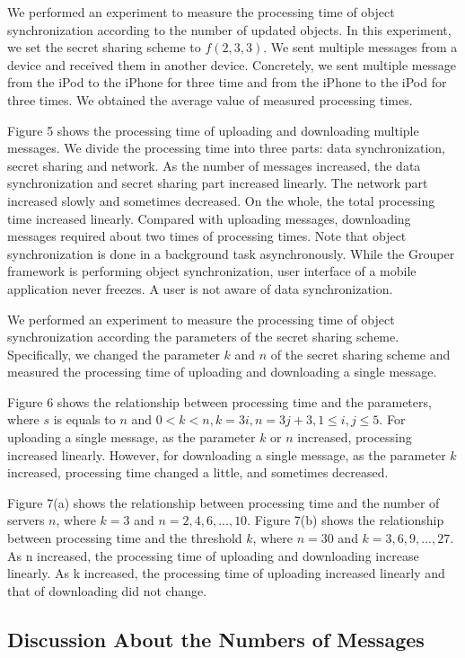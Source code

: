 \documentclass[twocolumn,10pt]{article}
\begin{document}
We performed an experiment to measure the processing time of object synchronization according to the number of updated objects.
In this experiment, we set the secret sharing scheme to ${f(2, 3, 3)}$.
We sent multiple messages from a device and received them in another device. 
Concretely, we sent multiple message from the iPod to the iPhone for three time and from the iPhone to the iPod for three times.
We obtained the average value of measured processing times.

Figure 5 shows the processing time of uploading and downloading multiple messages.
We divide the processing time into three parts: data synchronization, secret sharing and network.
As the number of messages increased, the data synchronization and secret sharing part increased linearly. 
The network part increased slowly and sometimes decreased.
On the whole, the total processing time increased linearly.
Compared with uploading messages, downloading messages required about two times of processing times.
Note that object synchronization is done in a background task asynchronously.
While the Grouper framework is performing object synchronization, user interface of a mobile application never freezes.
A user is not aware of data synchronization.

We performed an experiment to measure the processing time of object synchronization according the parameters of the secret sharing scheme.
Specifically, we changed the parameter ${k}$  and ${n}$ of the secret sharing scheme and measured the processing time of uploading and downloading a single message.

Figure 6 shows the relationship between processing time and the parameters, where $s$ is equals to $n$ and ${0< k < n, k=3i, n=3j+3, 1 \leq i, j \leq 5}$.
For uploading a single message, as the parameter ${k}$ or ${n}$ increased, processing increased linearly.
However, for downloading a single message, as the parameter ${k}$ increased, processing time  changed a little, and sometimes decreased.

Figure 7(a) shows the relationship between processing time and the number of servers ${n}$, where ${k=3}$ and ${n = 2, 4, 6, ... , 10}$. 
Figure 7(b) shows the relationship between processing time and the threshold ${k}$, where ${n=30}$ and ${k = 3, 6, 9, ... , 27}$. 
As n increased, the processing time of uploading and downloading increase linearly. 
As k increased, the processing time of uploading increased linearly and that of downloading did not change. 

\subsection{Discussion About the Numbers of Messages}
\end{document}
